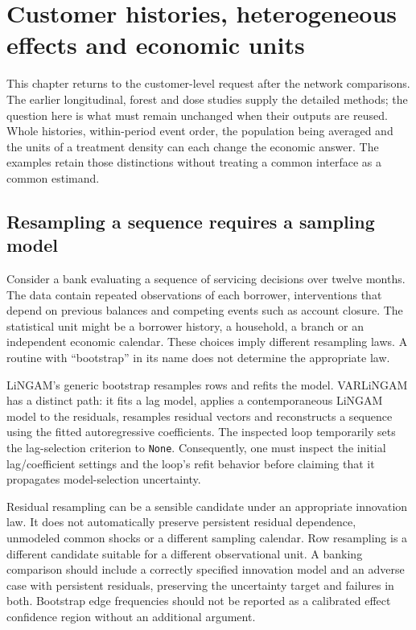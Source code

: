 \chapter{Customer histories, heterogeneous effects and economic units}
\label{v131:histories-forests}

This chapter returns to the customer-level request after the network comparisons.
The earlier longitudinal, forest and dose studies supply the detailed methods;
the question here is what must remain unchanged when their outputs are reused.
Whole histories, within-period event order, the population being averaged and
the units of a treatment density can each change the economic answer. The
examples retain those distinctions without treating a common interface as a
common estimand.

\section{Resampling a sequence requires a sampling model}

Consider a bank evaluating a sequence of servicing decisions over twelve
months. The data contain repeated observations of each borrower, interventions
that depend on previous balances and competing events such as account closure.
The statistical unit might be a borrower history, a household, a branch or an
independent economic calendar. These choices imply different resampling laws.
A routine with ``bootstrap'' in its name does not determine the appropriate law.

LiNGAM's generic bootstrap resamples rows and refits the model. VARLiNGAM has
a distinct path: it fits a lag model, applies a contemporaneous LiNGAM model to
the residuals, resamples residual vectors and reconstructs a sequence using the
fitted autoregressive coefficients. The inspected loop temporarily sets the
lag-selection criterion to \texttt{None}. Consequently, one must inspect the
initial lag/coefficient settings and the loop's refit behavior before claiming
that it propagates model-selection uncertainty. \citep{v131_sw_lingam}

Residual resampling can be a sensible candidate under an appropriate innovation
law. It does not automatically preserve persistent residual dependence,
unmodeled common shocks or a different sampling calendar. Row resampling is a
different candidate suitable for a different observational unit. A banking
comparison should include a correctly specified innovation model and an adverse
case with persistent residuals, preserving the uncertainty target and failures
in both. Bootstrap edge frequencies should not be reported as a calibrated
effect confidence region without an additional argument.

